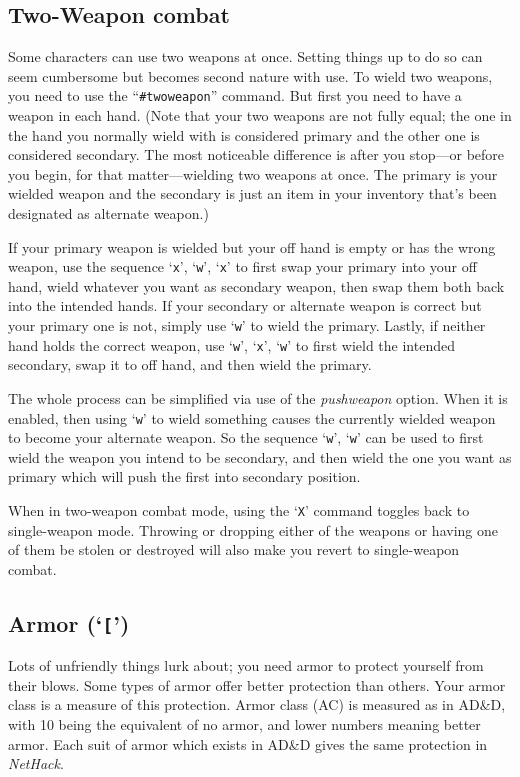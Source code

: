 \subsection*{Two-Weapon combat}

Some characters can use two weapons at once.  Setting things up to
do so can seem cumbersome but becomes second nature with use.
To wield two weapons, you need to use the ``{\tt \#twoweapon}'' command.
But first you need to have a weapon in each hand.
(Note that your two weapons are not fully equal; the one in the
hand you normally wield with is considered primary and the other
one is considered secondary.
The most noticeable difference is after you
stop---or before you begin, for that matter---wielding
two weapons at once.
The primary is your wielded weapon and the
secondary is just an item in your inventory that's been designated
as alternate weapon.)

If your primary weapon is wielded but your off hand is empty or has
the wrong weapon, use the sequence `{\tt x}', `{\tt w}', `{\tt x}' to
first swap your
primary into your off hand, wield whatever you want as secondary
weapon, then swap them both back into the intended hands.
If your secondary or alternate weapon is correct but your primary
one is not, simply use `{\tt w}' to wield the primary.
Lastly, if neither hand holds the correct weapon,
use `{\tt w}', `{\tt x}', `{\tt w}'
to first wield the intended secondary, swap it to off hand, and then
wield the primary.

The whole process can be simplified via use of the
{\it pushweapon\/}
option.  When it is enabled, then using `{\tt w}' to wield something
causes the currently wielded weapon to become your alternate weapon.
So the sequence `{\tt w}', `{\tt w}' can be used to first wield the weapon you
intend to be secondary, and then wield the one you want as primary
which will push the first into secondary position.

When in two-weapon combat mode, using the `{\tt X}' command
toggles back to single-weapon mode.
Throwing or dropping either of the
weapons or having one of them be stolen or destroyed will also make you
revert to single-weapon combat.

\subsection*{Armor (`{\tt \verb+[+}')}

Lots of unfriendly things lurk about; you need armor to protect
yourself from their blows.  Some types of armor offer better
protection than others.  Your armor class is a measure of this
protection.  Armor class (AC) is measured as in AD\&D, with 10 being
the equivalent of no armor, and lower numbers meaning better armor.
Each suit of armor which exists in AD\&D gives the same protection in
{\it NetHack}.

